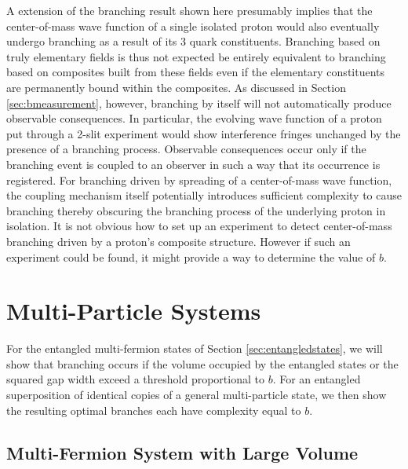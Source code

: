 \documentclass[12pt,amsmath,amssymb,onecolumn]{revtex4-2}
\begin{document}
A extension of the branching result shown here
presumably implies
that the center-of-mass wave function
of a single isolated proton
would also eventually undergo branching
as a result of its 3 quark constituents.
Branching based on truly elementary fields
is thus not expected be entirely equivalent to branching
based on composites built from these fields
even if the elementary constituents are permanently bound
within the composites.
As discussed in Section \ref{sec:bmeasurement},
however, branching by itself will not
automatically produce observable consequences.
In particular, the evolving wave function of
a proton put through a 2-slit
experiment would show interference fringes
unchanged by the presence
of a branching process.
Observable consequences occur only if
the branching event is coupled to an observer
in such a way that its occurrence is registered.
For branching driven by spreading of
a center-of-mass wave function,
the coupling mechanism itself potentially
introduces sufficient complexity to cause branching
thereby obscuring the branching process
of the underlying proton in isolation.
It is not obvious how to set up
an experiment to detect center-of-mass
branching driven by a proton's
composite structure.
However if such an experiment could be
found, it might provide a way
to determine the value of $b$.




\section{\label{sec:nparticles} Multi-Particle Systems}

For the entangled multi-fermion states of Section \ref{sec:entangledstates}, we
will show that branching occurs if the volume occupied by the entangled
states or the squared gap width exceed a threshold proportional to $b$. For an entangled
superposition of identical copies of a general multi-particle
state, we then show the resulting optimal branches each have complexity
equal to $b$. 

\subsection{\label{subsec:nfermionsv} Multi-Fermion System with Large Volume}
\end{document}
